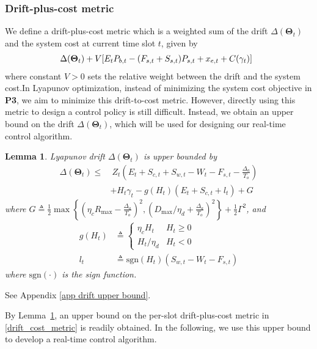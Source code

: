 \documentclass[journal]{IEEEtran}
\def\Thetabf{\boldsymbol \Theta}
\def\nn{\nonumber}
\newtheorem{lemma}{Lemma}
\begin{document}
\subsubsection{Drift-plus-cost metric}
We define a drift-plus-cost metric which is a weighted sum of the drift $\Delta(\Thetabf_t)$ and the system cost  at current time slot $t$, given by
\begin{align}\label{drift_cost_metric}
\hspace{-.5em}\Delta(\Thetabf_t)+V[E_tP_{b,t}-(F_{s,t}+S_{s,t})P_{s,t}+x_{e,t}+C(\gamma_t)]
\end{align}
where constant $V>0$ sets the relative weight between the drift and the system cost.In Lyapunov optimization, instead of minimizing the system cost objective in {\bf P3},  we aim to minimize this drift-to-cost metric. However, directly using this metric to design a control policy is still difficult.
Instead, we obtain an upper bound on the drift $\Delta(\Thetabf_t)$, which will be used for designing our  real-time control algorithm.
\begin{lemma}\label{lemma drift upper bound}
Lyapunov drift $\Delta(\Thetabf_t)$ is upper bounded by
\begin{align}\label{eqn:drift delta 1}
\Delta(\Thetabf_t)\leq&\
Z_t\left(E_t+S_{c,t}+S_{w,t}-W_t-F_{s,t}-\frac{\Delta_a}{T_o}\right)\nn\\
&+H_t\gamma_t-g(H_t)(E_t+S_{c,t}+l_t)+G
\end{align}
where $G \triangleq\frac{1}{2}\max\left\{(\eta_cR_{\max}-\frac{\Delta_a}{T_o})^2, (D_{\max}/\eta_d+\frac{\Delta_a}{T_o})^2\right\} +\frac{1}{2}\Gamma^2$, and
\begin{align}
g(H_t) &\triangleq \begin{cases}\eta_cH_t & H_t \ge 0 \\ H_t/\eta_d & H_t <0 \end{cases} \label{g(Ht)}\\
l_t & \triangleq \text{sgn}(H_t)(S_{w,t}-W_t-F_{s,t})
\end{align}
where $\text{sgn}(\cdot)$ is the sign function.
\end{lemma}
\IEEEproof
See Appendix \ref{app drift upper bound}.
\endIEEEproof

By Lemma~\ref{lemma drift upper bound}, an upper bound on the per-slot drift-plus-cost metric in \eqref{drift_cost_metric} is readily obtained. In the following, we use this upper bound to develop a real-time control algorithm.
\end{document}
